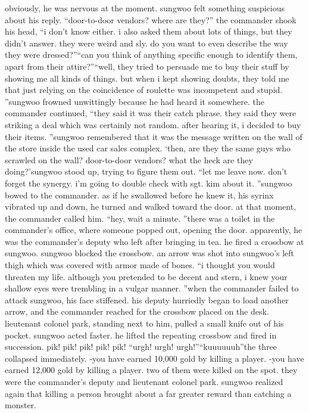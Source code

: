  obviously, he was nervous at the moment.
sungwoo felt something suspicious about his reply.
“door-to-door vendors? where are they?”
the commander shook his head, “i don’t know either.
 i also asked them about lots of things, but they didn’t answer.
 they were weird and sly.
 do you want to even describe the way they were dressed?”“can you think of anything specific enough to identify them, apart from their attire?”“well, they tried to persuade me to buy their stuff by showing me all kinds of things.
 but when i kept showing doubts, they told me that just relying on the coincidence of roulette was incompetent and stupid.
”sungwoo frowned unwittingly because he had heard it somewhere.
the commander continued, “they said it was their catch phrase.
 they said they were striking a deal which was certainly not random.
 after hearing it, i decided to buy their items.
”sungwoo remembered that it was the message written on the wall of the store inside the used car sales complex.
‘then, are they the same guys who scrawled on the wall? door-to-door vendors? what the heck are they doing?’sungwoo stood up, trying to figure them out.
“let me leave now.
 don’t forget the synergy.
 i’m going to double check with sgt.
 kim about it.
”sungwoo bowed to the commander.
 as if he swallowed before he knew it, his syrinx vibrated up and down, he turned and walked toward the door.
at that moment, the commander called him.
“hey, wait a minute.
”there was a toilet in the commander’s office, where someone popped out, opening the door.
 apparently, he was the commander’s deputy who left after bringing in tea.
he fired a crossbow at sungwoo.
sungwoo blocked the crossbow.
 an arrow was shot into sungwoo’s left thigh which was covered with armor made of bones.
“i thought you would threaten my life.
 although you pretended to be decent and stern, i knew your shallow eyes were trembling in a vulgar manner.
”when the commander failed to attack sungwoo, his face stiffened.
 his deputy hurriedly began to load another arrow, and the commander reached for the crossbow placed on the desk.
 lieutenant colonel park, standing next to him, pulled a small knife out of his pocket.
sungwoo acted faster.
 he lifted the repeating crossbow and fired in succession.
pik! pik! pik! pik! pik!
“urgh! urgh! urgh!”“kuuuuuuh”the three collapsed immediately.
-you have earned 10,000 gold by killing a player.
-you have earned 12,000 gold by killing a player.
two of them were killed on the spot.
 they were the commander’s deputy and lieutenant colonel park.
sungwoo realized again that killing a person brought about a far greater reward than catching a monster.
